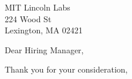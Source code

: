 \documentclass[10pt,letter]{letter}
\def\nameunknown{Hiring Manager}
\def\hm{\nameunknown} %
\def\company{MIT Lincoln Labs} %
\def\compaddress{224 Wood St}
\def\compcity{Lexington, MA 02421}
\begin{document}
\begin{letter}{\company \\ \compaddress \\ \compcity}

\opening{Dear Hiring Manager,}

\setlength\parindent{.5in}



 

\closing{Thank you for your consideration,}
\end{letter}
\end{document}
